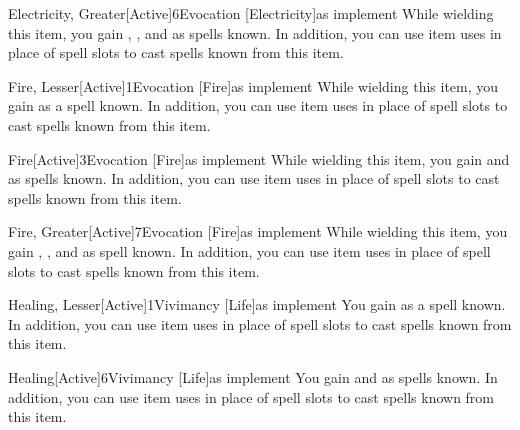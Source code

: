         \begin{magicitemdef}{Electricity, Greater}[Active]{6}{Evocation [Electricity]}{as implement}
             While wielding this item, you gain , , and  as spells known.
            In addition, you can use item uses in place of spell slots to cast spells known from this item.
        \end{magicitemdef}

        \begin{magicitemdef}{Fire, Lesser}[Active]{1}{Evocation [Fire]}{as implement}
             While wielding this item, you gain  as a spell known.
            In addition, you can use item uses in place of spell slots to cast spells known from this item.
        \end{magicitemdef}

        \begin{magicitemdef}{Fire}[Active]{3}{Evocation [Fire]}{as implement}
             While wielding this item, you gain  and  as spells known.
            In addition, you can use item uses in place of spell slots to cast spells known from this item.
        \end{magicitemdef}

        \begin{magicitemdef}{Fire, Greater}[Active]{7}{Evocation [Fire]}{as implement}
             While wielding this item, you gain , , and  as spell known.
            In addition, you can use item uses in place of spell slots to cast spells known from this item.
        \end{magicitemdef}

        \begin{magicitemdef}{Healing, Lesser}[Active]{1}{Vivimancy [Life]}{as implement}
             You gain  as a spell known.
            In addition, you can use item uses in place of spell slots to cast spells known from this item.
        \end{magicitemdef}

        \begin{magicitemdef}{Healing}[Active]{6}{Vivimancy [Life]}{as implement}
             You gain  and  as spells known.
            In addition, you can use item uses in place of spell slots to cast spells known from this item.
        \end{magicitemdef}

